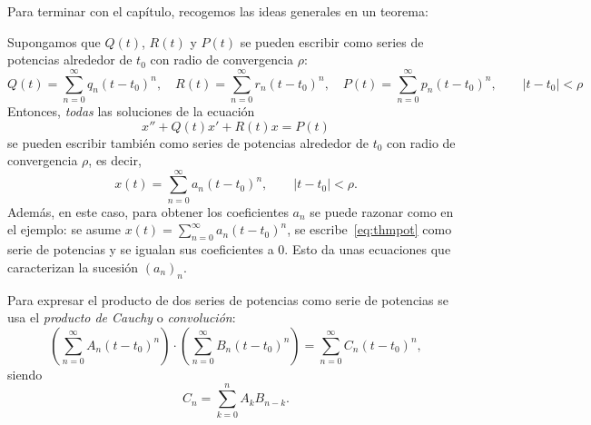\documentclass[../ecuaciones_diferenciales.tex]{subfiles}
\begin{document}
Para terminar con el capítulo, recogemos las ideas generales en un teorema:
\begin{theorem}
	Supongamos que \(Q(t)\), \(R(t)\) y \(P(t)\) se pueden escribir como series
	de potencias alrededor de \(t_0\) con radio de convergencia \(\rho\):
	\[Q(t) = \sum_{n=0}^\infty q_n(t-t_0)^n, \quad R(t) = \sum_{n=0}^\infty
		r_n(t-t_0)^n, \quad P(t) = \sum_{n=0}^\infty p_n(t-t_0)^n,
		\qquad |t-t_0| < \rho\]
	Entonces, \emph{todas} las soluciones de la ecuación
	\begin{equation} \label{eq:thmpot}
		x'' + Q(t)x' + R(t)x = P(t)
	\end{equation}
	se pueden escribir también como series de potencias alrededor de
	\(t_0\) con radio de convergencia \(\rho\), es decir,
	\[x(t) = \sum_{n=0}^\infty a_n(t-t_0)^n, \qquad |t-t_0| < \rho.\]
	Además, en este caso, para obtener los coeficientes \(a_n\) se puede razonar
	como en el ejemplo: se asume \(x(t) = \sum_{n=0}^\infty a_n(t-t_0)^n\), se
	escribe~\eqref{eq:thmpot} como serie de potencias y se igualan sus
	coeficientes a 0. Esto da unas ecuaciones que caracterizan la sucesión
	\((a_n)_n\).
\end{theorem}

\begin{remark}
	Para expresar el producto de dos series de potencias como serie de potencias
	se usa el \emph{producto de Cauchy} o \emph{convolución}:
	\[\left( \sum_{n=0}^\infty A_n (t-t_0)^n \right) \cdot
		\left( \sum_{n=0}^\infty B_n (t-t_0)^n \right) =
		\sum_{n=0}^\infty C_n (t-t_0)^n,\]
	siendo
	\[C_n = \sum_{k=0}^n A_kB_{n-k}.\]
\end{remark}
\end{document}
